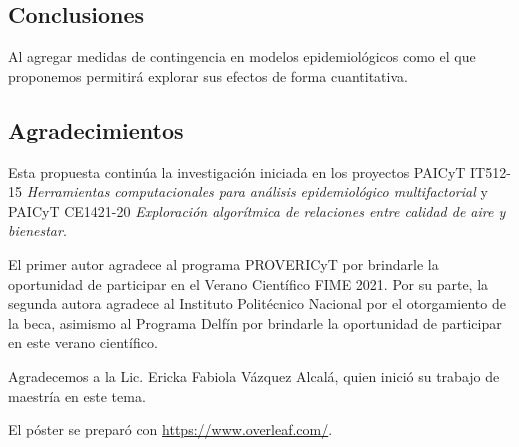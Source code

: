\documentclass[a4]{sciposter}
\begin{document}
\begin{multicols}{2}
\section{Conclusiones}

Al agregar medidas de contingencia en modelos epidemiológicos como el que proponemos permitirá explorar sus efectos de forma cuantitativa.

\subsection*{Agradecimientos}

{\small Esta propuesta continúa la investigación iniciada en los proyectos PAICyT IT512-15 \emph{Herramientas computacionales para análisis epidemiológico multifactorial} y PAICyT CE1421-20 \emph{Exploración algorítmica de relaciones entre calidad de aire y bienestar}.
    
    El primer autor agradece al programa PROVERICyT por brindarle la oportunidad de participar en el Verano Científico FIME 2021.
    Por su parte, la segunda autora agradece al Instituto Politécnico Nacional por el otorgamiento de la beca, asimismo al Programa Delfín por brindarle la oportunidad de participar en este verano científico.

    Agradecemos a la Lic. Ericka Fabiola Vázquez Alcalá, quien inició su trabajo de maestría en este tema.
    
    El póster se preparó con \url{https://www.overleaf.com/}.}

\end{multicols} 



\end{document}
